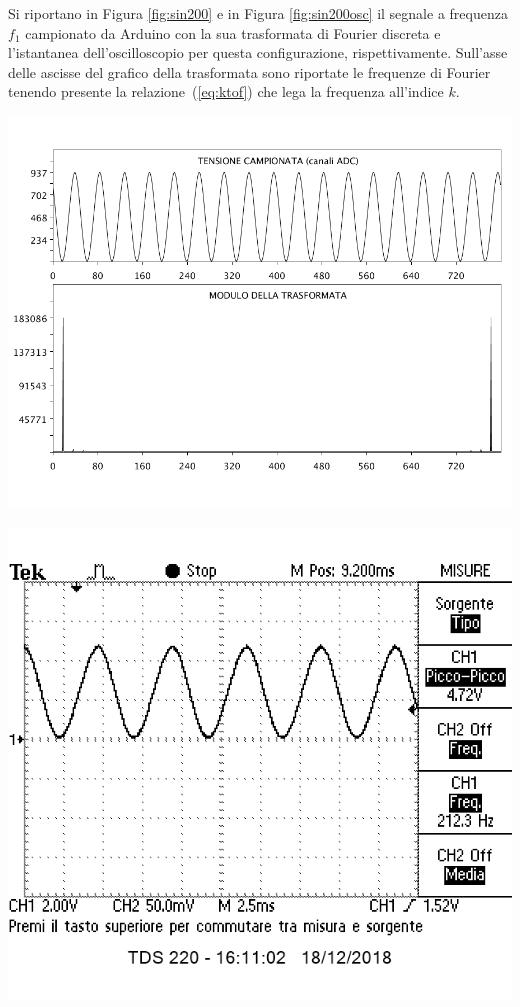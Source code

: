 \documentclass[10pt,oneside,a4paper]{article}
\newenvironment{Figure}
  {\par\medskip\noindent\minipage{\linewidth}}
  {\endminipage\par\medskip}
\begin{document}
\begin{multicols}{2}
Si riportano in Figura \ref{fig:sin200} e in Figura \ref{fig:sin200osc} il segnale a frequenza $f_1$ campionato da Arduino con la sua trasformata di Fourier discreta e l'istantanea dell'oscilloscopio per questa configurazione, rispettivamente. Sull'asse delle ascisse del grafico della trasformata sono riportate le frequenze di Fourier tenendo presente la relazione~(\ref{eq:ktof}) che lega la frequenza all'indice $k$.

\begin{Figure}
	\begin{center}
	\includegraphics[width=\linewidth]{sin200}
	\label{fig:sin200}
	\end{center}
\end{Figure}

\begin{Figure}
	\begin{center}
	\includegraphics[width=0.8\linewidth]{sin200osc}
	\label{fig:sin200osc}
	\end{center}
\end{Figure}


\end{multicols}
\end{document}
